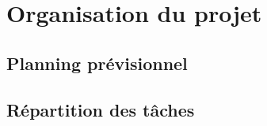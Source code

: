 \section{Organisation du projet}
    \subsection{Planning prévisionnel}
    \subsection{Répartition des tâches}